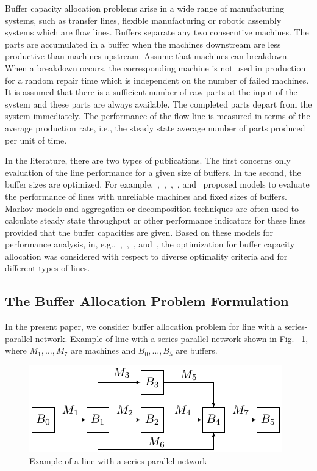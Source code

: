\documentclass{ifacconf}
\begin{document}
Buffer  capacity  allocation  problems  arise  in  a  wide  range  of  manufacturing  systems, 
such  as  transfer  lines,  flexible  manufacturing  or  robotic  assembly  systems  which  are 
flow lines. Buffers separate any two consecutive machines. The parts are accumulated in
a buffer when the machines downstream are less productive than machines upstream. 
Assume that machines can breakdown. When a breakdown occurs, the corresponding 
machine is not used in production for a random repair time which is independent on the 
number of failed machines. It is assumed that there is a sufficient number of raw parts at 
the input of the system and these parts are always available. The completed parts depart 
from the system immediately. The performance of the flow-line is measured in terms of 
the average production rate, i.e., the steady state average number of parts produced per 
unit of time.

In the literature, there are two types of publications. The first concerns only evaluation 
of the line performance for a given size of buffers. In the second, the buffer sizes are 
optimized. For example,~\cite{DG92},~\cite{Gershwin1993},~\cite{HPB1993},~\cite{Meerkov2009}, and~\cite{TanGer09} proposed models to 
evaluate the performance of lines with unreliable machines and fixed sizes of buffers. 
Markov models and aggregation or decomposition techniques are often used to calculate 
steady state throughput or other performance indicators for these lines provided that the 
buffer  capacities  are  given.  Based  on  these  models  for  performance  analysis,  in,  e.g.,~\cite{SmiDas88},~\cite{So97},~\cite{GS},  and~\cite{ShiGer2009},  the  optimization  for  buffer  capacity  allocation  was  considered  with 
respect to diverse optimality criteria and for different types of lines.

\subsection{The Buffer Allocation Problem Formulation} \label{bap_formulation}

In the present paper, we consider buffer allocation problem for line with a series-parallel network. Example of line with a series-parallel network shown in Fig. ~\ref{lineexample}, where $M_1,…,M_7$ are machines and $B_0,…,B_5$ are buffers.

 \begin{figure}[h!]
	\centering
	\includegraphics[scale=0.9]{LineSchems}
  \caption{Example of a line with a series-parallel network\label{lineexample}}
  \end{figure}
\end{document}
